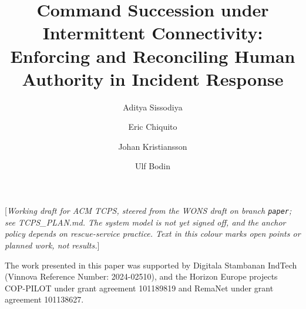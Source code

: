 \documentclass[acmsmall,review]{acmart}
\newcommand{\pending}[1]{\textcolor{fence}{[\textit{#1}]}}
\begin{document}
\title[Command Succession under Intermittent Connectivity]{Command Succession under
Intermittent Connectivity: Enforcing and Reconciling Human Authority in Incident Response}

\author{Aditya Sissodiya}
\author{Eric Chiquito}
\author{Johan Kristiansson}
\author{Ulf Bodin}

\renewcommand{\shortauthors}{Sissodiya et al.}

\begin{abstract}

\end{abstract}



\maketitle

\noindent\pending{Working draft for ACM TCPS, steered from the WONS draft on branch
\texttt{paper}; see TCPS\_PLAN.md. The system model is not yet signed off, and the anchor
policy depends on rescue-service practice. Text in this colour marks open points or
planned work, not results.}










\begin{acks}
The work presented in this paper was supported by Digitala Stambanan IndTech (Vinnova
Reference Number: 2024-02510), and the Horizon Europe projects COP-PILOT under grant
agreement 101189819 and RemaNet under grant agreement 101138627.
\end{acks}



\end{document}
